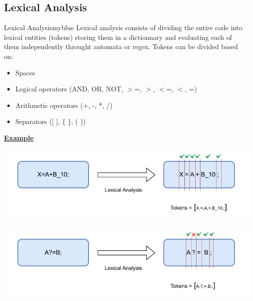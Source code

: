 \vspace{0.25cm}

\subsection{Lexical Analysis}
\begin{prettyBox}{Lexical Analysis}{myblue}
Lexical analysis consists of dividing the entire code into lexical entities (tokens) storing them in a dictionnary and evaluating each of them independently throught automata or regex. Tokens can be divided based on:
\begin{itemize}
    \item Spaces
    \item Logical operators (AND, OR, NOT, \(>\)=, \(>\), \(<\)=, \(<\), =)
    \item Arithmetic operators (+, -, *, /)
    \item Separators ([ ], \{ \}, ( ))
\end{itemize}
\end{prettyBox}

\newpage
\underline{\textbf{Example}}

\begin{center}
    \includegraphics{Chapters/Examples/Intro/ex1.drawio.pdf}
\end{center}

\vspace{0.25cm}
\begin{center}
    \includegraphics{Chapters/Examples/Intro/ex2.drawio.pdf}
\end{center}

\vspace{0.35cm}

